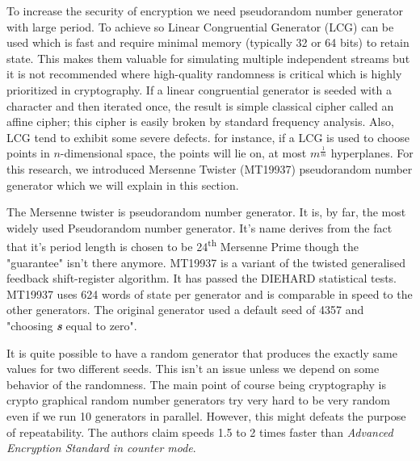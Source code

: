 \documentclass[12pt,journal,compsoc]{IEEEtran}
\begin{document}
To increase the security of encryption we need pseudorandom number generator with large period. To achieve so Linear Congruential Generator (LCG)\cite{lcg_cryptography} can be used which is fast and require minimal memory (typically 32 or 64 bits) to retain state. This makes them valuable for simulating multiple independent streams but it is not recommended where high-quality randomness is critical which is highly prioritized in cryptography. If a linear congruential generator is seeded with a character and then iterated once, the result is simple classical cipher called an affine cipher\cite{affine_cipher}; this cipher is easily broken by standard frequency analysis. Also, LCG tend to exhibit some severe defects. for instance, if a LCG is used to choose points in $n$-dimensional space, the points will lie on, at most $m^{\frac{1}{m}}$ hyperplanes\cite{marsaglia_theorem}. For this research, we introduced Mersenne Twister (MT19937) pseudorandom number generator which we will explain in this section.


The Mersenne twister\cite{MT19937} is pseudorandom number generator. It is, by far, the most widely used Pseudorandom number generator. It's name derives from the fact that it's period length is chosen to be 24\textsuperscript{th} Mersenne Prime though the "guarantee" isn't there anymore. MT19937 is a variant of the twisted generalised feedback shift-register algorithm. It has passed the DIEHARD statistical tests. MT19937 uses 624 words of state per generator and is comparable in speed to the other generators. The original generator used a default seed of 4357 and "choosing \emph{{\bf s}} equal to zero".\cite{MT19937}

 It is quite possible to have a random generator that produces the exactly same values for two different seeds. This isn't an issue unless we depend on some behavior of the randomness. The main point of course being cryptography is crypto graphical random number generators try very hard to be very random even if we run 10 generators in parallel. However, this might defeats the purpose of repeatability. The authors claim speeds 1.5 to 2 times faster than \emph{Advanced Encryption Standard in counter mode}\cite{1347044}.
\end{document}
